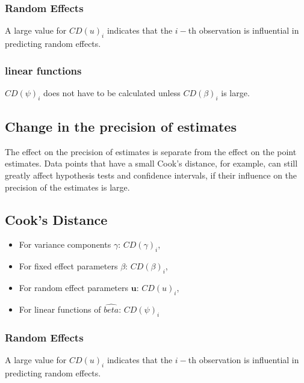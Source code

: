 \documentclass[12pt, a4paper]{article}
\begin{document}
\newpage
\subsubsection{Random Effects}

A large value for $CD(u)_i$ indicates that the $i-$th observation is influential in predicting random effects.

\subsubsection{linear functions}

$CD(\psi)_i$ does not have to be calculated unless $CD(\beta)_i$ is large.




\newpage
\subsection{Change in the precision of estimates}

The effect on the precision of estimates is separate from the effect on the point estimates. Data points that
have a small Cook's distance, for example, can still greatly affect hypothesis tests and confidence intervals, if their  influence on the precision of the estimates is large.


\subsection{Cook's Distance}
\begin{itemize}
	\item For variance components $\gamma$: $CD(\gamma)_i$,
	\item For fixed effect parameters $\beta$: $CD(\beta)_i$,
	\item For random effect parameters $\boldsymbol{u}$: $CD(u)_i$,
	\item For linear functions of $\hat{beta}$: $CD(\psi)_i$
\end{itemize}


\subsubsection{Random Effects}

A large value for $CD(u)_i$ indicates that the $i-$th observation is influential in predicting random effects.
\end{document}
